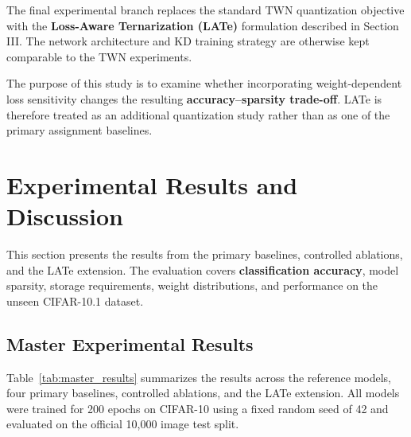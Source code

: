 \documentclass[conference]{IEEEtran}
\begin{document}
The final experimental branch replaces the standard TWN quantization
objective with the \textbf{Loss-Aware Ternarization (LATe)} formulation
described in Section III. The network architecture and KD training
strategy are otherwise kept comparable to the TWN experiments.

The purpose of this study is to examine whether incorporating
weight-dependent loss sensitivity changes the resulting
\textbf{accuracy--sparsity trade-off}. LATe is therefore treated as an
additional quantization study rather than as one of the primary
assignment baselines.


\section{Experimental Results and Discussion}

This section presents the results from the primary baselines, controlled
ablations, and the LATe extension. The evaluation covers
\textbf{classification accuracy}, model sparsity, storage requirements,
weight distributions, and performance on the unseen CIFAR-10.1 dataset.


\subsection{Master Experimental Results}

Table~\ref{tab:master_results} summarizes the results across the
reference models, four primary baselines, controlled ablations, and the
LATe extension. All models were trained for 200 epochs on CIFAR-10
using a fixed random seed of 42 and evaluated on the official 10,000
image test split.
\end{document}
